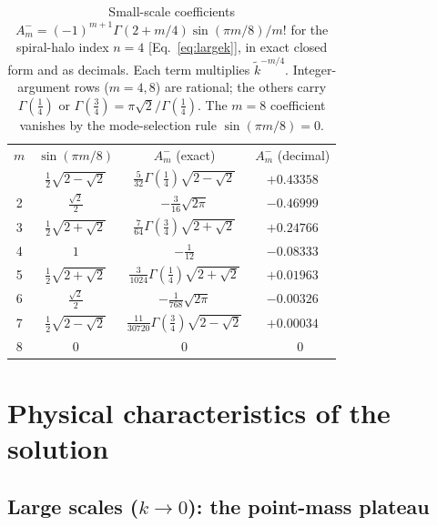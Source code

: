 \documentclass[aps,prd,onecolumn]{revtex4-2}
\newcommand{\kt}{\tilde{k}}          %
\begin{document}
\begin{table}[t]
\caption{Small-scale coefficients
$A_m^{-}=(-1)^{m+1}\Gamma(2+m/4)\sin(\pi m/8)/m!$ for the spiral-halo
index $n=4$ [Eq.~\eqref{eq:largek}], in exact closed form and as decimals.
Each term multiplies $\kt^{-m/4}$.  Integer-argument rows ($m=4,8$) are
rational; the others carry $\Gamma(\tfrac14)$ or
$\Gamma(\tfrac34)=\pi\sqrt2/\Gamma(\tfrac14)$.  The $m=8$ coefficient
vanishes by the mode-selection rule $\sin(\pi m/8)=0$.}
\label{tab:n4}
\begin{ruledtabular}
\begin{tabular}{cccc}
$m$ & $\sin(\pi m/8)$ & $A_m^{-}$ (exact) & $A_m^{-}$ (decimal) \\
\colrule
1 & $\tfrac12\sqrt{2-\sqrt2}$ & $\tfrac{5}{32}\Gamma(\tfrac14)\sqrt{2-\sqrt2}$   & $+0.43358$ \\
2 & $\tfrac{\sqrt2}{2}$       & $-\tfrac{3}{16}\sqrt{2\pi}$                       & $-0.46999$ \\
3 & $\tfrac12\sqrt{2+\sqrt2}$ & $\tfrac{7}{64}\Gamma(\tfrac34)\sqrt{2+\sqrt2}$   & $+0.24766$ \\
4 & $1$                       & $-\tfrac{1}{12}$                                  & $-0.08333$ \\
5 & $\tfrac12\sqrt{2+\sqrt2}$ & $\tfrac{3}{1024}\Gamma(\tfrac14)\sqrt{2+\sqrt2}$ & $+0.01963$ \\
6 & $\tfrac{\sqrt2}{2}$       & $-\tfrac{1}{768}\sqrt{2\pi}$                      & $-0.00326$ \\
7 & $\tfrac12\sqrt{2-\sqrt2}$ & $\tfrac{11}{30720}\Gamma(\tfrac34)\sqrt{2-\sqrt2}$ & $+0.00034$ \\
8 & $0$                       & $0$                                               & $\phantom{+}0$ \\
\end{tabular}
\end{ruledtabular}
\end{table}

\section{Physical characteristics of the solution}
\label{sec:physics}

\subsection{Large scales ($k\to0$): the point-mass plateau}
\label{sec:kzero}
\end{document}
